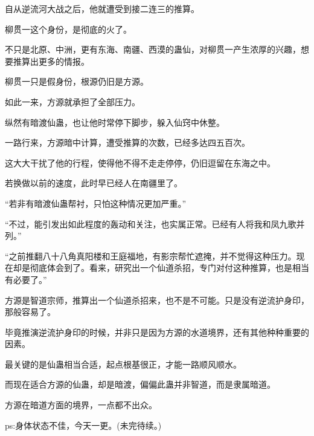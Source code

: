 \begin{this_body}
自从逆流河大战之后，他就遭受到接二连三的推算。

柳贯一这个身份，是彻底的火了。

不只是北原、中洲，更有东海、南疆、西漠的蛊仙，对柳贯一产生浓厚的兴趣，想要推算出更多的情报。

柳贯一只是假身份，根源仍旧是方源。

如此一来，方源就承担了全部压力。

纵然有暗渡仙蛊，也让他时常停下脚步，躲入仙窍中休整。

一路行来，方源暗中计算，遭受推算的次数，已经多达四五百次。

这大大干扰了他的行程，使得他不得不走走停停，仍旧逗留在东海之中。

若换做以前的速度，此时早已经人在南疆里了。

“若非有暗渡仙蛊帮衬，只怕这种情况更加严重。”

“不过，能引发出如此程度的轰动和关注，也实属正常。已经有人将我和凤九歌并列。”

“之前推翻八十八角真阳楼和王庭福地，有影宗帮忙遮掩，并不觉得这种压力。现在却是彻底体会到了。看来，研究出一个仙道杀招，专门对付这种推算，也是相当有必要了。”

方源是智道宗师，推算出一个仙道杀招来，也不是不可能。只是没有逆流护身印，那般容易了。

毕竟推演逆流护身印的时候，并非只是因为方源的水道境界，还有其他种种重要的因素。

最关键的是仙蛊相当合适，起点根基很正，才能一路顺风顺水。

而现在适合方源的仙蛊，却是暗渡，偏偏此蛊并非智道，而是隶属暗道。

方源在暗道方面的境界，一点都不出众。

ps:身体状态不佳，今天一更。(未完待续。)

\end{this_body}

